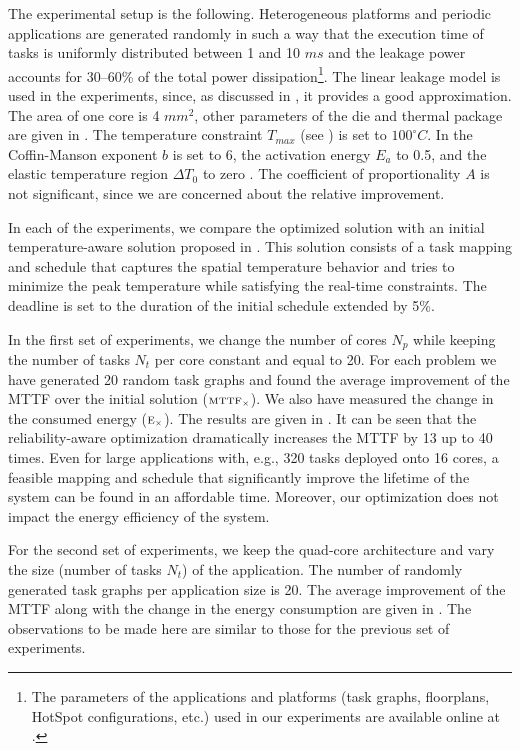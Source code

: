 The experimental setup is the following. Heterogeneous platforms and periodic applications are generated randomly \cite{dick1998} in such a way that the execution time of tasks is uniformly distributed between 1 and 10 $ms$ and the leakage power accounts for 30--60\% of the total power dissipation\footnote{The parameters of the applications and platforms (task graphs, floorplans, HotSpot configurations, etc.) used in our experiments are available online at \cite{liu2011}.}. The linear leakage model is used in the experiments, since, as discussed in , it provides a good approximation. The area of one core is 4 $mm^2$, other parameters of the die and thermal package are given in . The temperature constraint $T_{max}$ (see ) is set to $100^\circ C$. In  the Coffin-Manson exponent $b$ is set to 6, the activation energy $E_a$ to 0.5, and the elastic temperature region $\Delta T_0$ to zero \cite{jedec2010}. The coefficient of proportionality $A$ is not significant, since we are concerned about the relative improvement.

In each of the experiments, we compare the optimized solution with an initial temperature-aware solution proposed in \cite{xie2006}. This solution consists of a task mapping and schedule that captures the spatial temperature behavior and tries to minimize the peak temperature while satisfying the real-time constraints. The deadline is set to the duration of the initial schedule extended by 5\%.

In the first set of experiments, we change the number of cores $N_p$ while keeping the number of tasks $N_t$ per core constant and equal to 20. For each problem we have generated 20 random task graphs and found the average improvement of the MTTF over the initial solution ($\scriptstyle \text{MTTF}_\times$). We also have measured the change in the consumed energy ($\scriptstyle \text{E}_\times$). The results are given in . It can be seen that the reliability-aware optimization dramatically increases the MTTF by 13 up to 40 times. Even for large applications with, e.g., 320 tasks deployed onto 16 cores, a feasible mapping and schedule that significantly improve the lifetime of the system can be found in an affordable time. Moreover, our optimization does not impact the energy efficiency of the system.

For the second set of experiments, we keep the quad-core architecture and vary the size (number of tasks $N_t$) of the application. The number of randomly generated task graphs per application size is 20. The average improvement of the MTTF along with the change in the energy consumption are given in . The observations to be made here are similar to those for the previous set of experiments.

